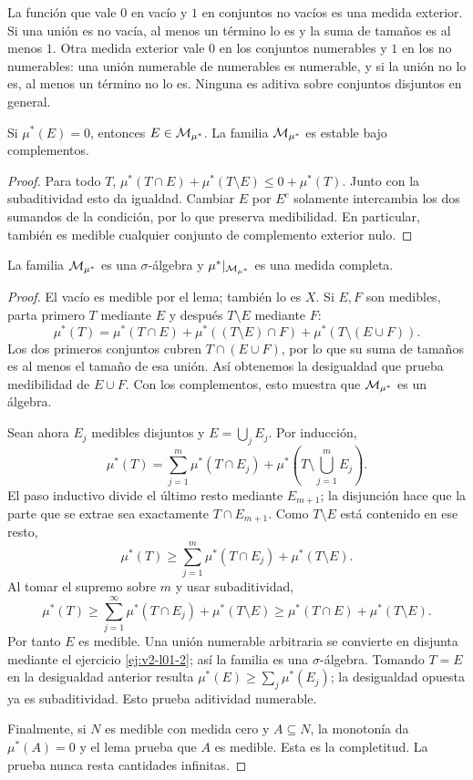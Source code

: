 \begin{ejemplo}
La función que vale $0$ en vacío y $1$ en conjuntos no vacíos es una medida exterior. Si una unión es no vacía, al menos un término lo es y la suma de tamaños es al menos $1$. Otra medida exterior vale $0$ en los conjuntos numerables y $1$ en los no numerables: una unión numerable de numerables es numerable, y si la unión no lo es, al menos un término no lo es. Ninguna es aditiva sobre conjuntos disjuntos en general.
\end{ejemplo}
\begin{lema}
Si $\mu^*(E)=0$, entonces $E\in\mathcal M_{\mu^*}$. La familia $\mathcal M_{\mu^*}$ es estable bajo complementos.
\end{lema}
\begin{proof}
Para todo $T$, $\mu^*(T\cap E)+\mu^*(T\setminus E)\le0+\mu^*(T)$. Junto con la subaditividad esto da igualdad. Cambiar $E$ por $E^c$ solamente intercambia los dos sumandos de la condición, por lo que preserva medibilidad. En particular, también es medible cualquier conjunto de complemento exterior nulo.
\end{proof}
\begin{teorema}[Carathéodory]\label{teo:v2-carath}
La familia $\mathcal M_{\mu^*}$ es una $\sigma$-álgebra y $\mu^*|_{\mathcal M_{\mu^*}}$ es una medida completa.
\end{teorema}
\begin{proof}
El vacío es medible por el lema; también lo es $X$. Si $E,F$ son medibles, parta primero $T$ mediante $E$ y después $T\setminus E$ mediante $F$:
\[\mu^*(T)=\mu^*(T\cap E)+\mu^*((T\setminus E)\cap F)+\mu^*(T\setminus(E\cup F)).\]
Los dos primeros conjuntos cubren $T\cap(E\cup F)$, por lo que su suma de tamaños es al menos el tamaño de esa unión. Así obtenemos la desigualdad que prueba medibilidad de $E\cup F$. Con los complementos, esto muestra que $\mathcal M_{\mu^*}$ es un álgebra.

Sean ahora $E_j$ medibles disjuntos y $E=\bigcup_jE_j$. Por inducción,
\[\mu^*(T)=\sum_{j=1}^m\mu^*(T\cap E_j)+\mu^*\left(T\setminus\bigcup_{j=1}^mE_j\right).\]
El paso inductivo divide el último resto mediante $E_{m+1}$; la disjunción hace que la parte que se extrae sea exactamente $T\cap E_{m+1}$. Como $T\setminus E$ está contenido en ese resto,
\[\mu^*(T)\ge\sum_{j=1}^m\mu^*(T\cap E_j)+\mu^*(T\setminus E).\]
Al tomar el supremo sobre $m$ y usar subaditividad,
\[\mu^*(T)\ge\sum_{j=1}^\infty\mu^*(T\cap E_j)+\mu^*(T\setminus E)
\ge\mu^*(T\cap E)+\mu^*(T\setminus E).\]
Por tanto $E$ es medible. Una unión numerable arbitraria se convierte en disjunta mediante el ejercicio \ref{ej:v2-l01-2}; así la familia es una $\sigma$-álgebra. Tomando $T=E$ en la desigualdad anterior resulta $\mu^*(E)\ge\sum_j\mu^*(E_j)$; la desigualdad opuesta ya es subaditividad. Esto prueba aditividad numerable.

Finalmente, si $N$ es medible con medida cero y $A\subseteq N$, la monotonía da $\mu^*(A)=0$ y el lema prueba que $A$ es medible. Esta es la completitud. La prueba nunca resta cantidades infinitas.
\end{proof}

